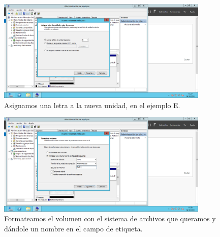 {\begin{figure}[H]
	\centering
	\includegraphics[width=0.9\textwidth]{raid1-5.png} 
	\caption{Asignamos una letra a la nueva unidad, en el ejemplo E.}
\end{figure}

\begin{figure}[H]
	\centering
	\includegraphics[width=0.9\textwidth]{raid1-6.png}
	\caption{Formateamos el volumen con el sistema de archivos que queramos y dándole un nombre en el campo de etiqueta.}
\end{figure}
	
}
